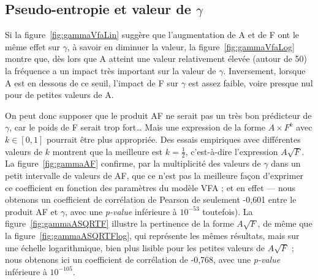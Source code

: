 	\subsection{Pseudo-entropie et valeur de $\gamma$}
	Si la figure~\ref{fig:gammaVfaLin} suggère que l'augmentation de A et de F ont le même effet sur $\gamma$, à savoir en diminuer la valeur, la figure~\ref{fig:gammaVfaLog} montre que, dès lors que A atteint une valeur relativement élevée (autour de 50) la fréquence a un impact très important sur la valeur de $\gamma$. Inversement, lorsque A est en dessous de ce seuil, l'impact de F sur $\gamma$ est assez faible, voire presque nul pour de petites valeurs de A.
	
	On peut donc supposer que le produit AF ne serait pas un très bon prédicteur de $\gamma$, car le poids de F serait trop fort\ldots{} Mais une expression de la forme $A\times{}F^{k}$ avec $k \in [0,1]$ pourrait être plus appropriée. Des essais empiriques avec différentes valeurs de $k$ montrent que la meilleure est $k = \frac{1}{2}$, c'est-à-dire l'expression $A\sqrt{F}$. La figure~\ref{fig:gammaAF} confirme, par la multiplicité des valeurs de $\gamma$ dans un petit intervalle de valeurs de AF, que ce n'est pas la meilleure façon d'exprimer ce coefficient en fonction des paramètres du modèle VFA ; et en effet --- nous obtenons un coefficient de corrélation de Pearson de seulement -0,601 entre le produit AF et $\gamma$, avec une \emph{p-value} inférieure à $10^{-53}$ toutefois). La figure~\ref{fig:gammaASQRTF} illustre la pertinence de la forme $A\sqrt{F}$, de même que la figure~\ref{fig:gammaASQRTFlog}, qui représente les mêmes résultats, mais sur une échelle logarithmique, bien plus lisible pour les petites valeurs de $A\sqrt{F}$ ; nous obtenons ici un coefficient de corrélation de -0,768, avec une \emph{p-value} inférieure à $10^{-105}$.
	

